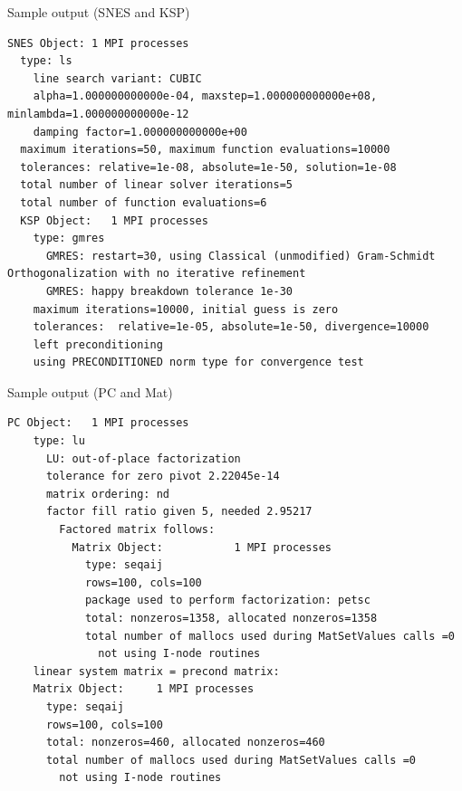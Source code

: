 \begin{frame}[fragile]{Sample output (SNES and KSP)}
\begin{Verbatim}[formatcom=\footnotesize]
SNES Object: 1 MPI processes
  type: ls
    line search variant: CUBIC
    alpha=1.000000000000e-04, maxstep=1.000000000000e+08, minlambda=1.000000000000e-12
    damping factor=1.000000000000e+00
  maximum iterations=50, maximum function evaluations=10000
  tolerances: relative=1e-08, absolute=1e-50, solution=1e-08
  total number of linear solver iterations=5
  total number of function evaluations=6
  KSP Object:   1 MPI processes
    type: gmres
      GMRES: restart=30, using Classical (unmodified) Gram-Schmidt Orthogonalization with no iterative refinement
      GMRES: happy breakdown tolerance 1e-30
    maximum iterations=10000, initial guess is zero
    tolerances:  relative=1e-05, absolute=1e-50, divergence=10000
    left preconditioning
    using PRECONDITIONED norm type for convergence test
\end{Verbatim}
\end{frame}
\begin{frame}[fragile]{Sample output (PC and Mat)}
\begin{Verbatim}[formatcom=\footnotesize]
  PC Object:   1 MPI processes
    type: lu
      LU: out-of-place factorization
      tolerance for zero pivot 2.22045e-14
      matrix ordering: nd
      factor fill ratio given 5, needed 2.95217
        Factored matrix follows:
          Matrix Object:           1 MPI processes
            type: seqaij
            rows=100, cols=100
            package used to perform factorization: petsc
            total: nonzeros=1358, allocated nonzeros=1358
            total number of mallocs used during MatSetValues calls =0
              not using I-node routines
    linear system matrix = precond matrix:
    Matrix Object:     1 MPI processes
      type: seqaij
      rows=100, cols=100
      total: nonzeros=460, allocated nonzeros=460
      total number of mallocs used during MatSetValues calls =0
        not using I-node routines
\end{Verbatim}
\end{frame}

